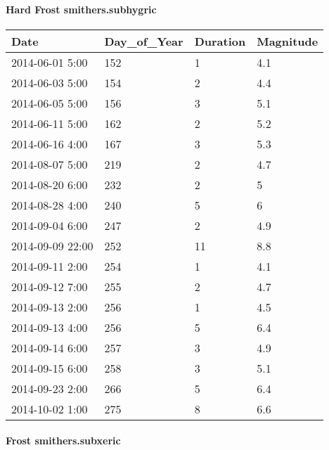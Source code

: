 \documentclass[
]{article}
\begin{document}
\hypertarget{hard-frost-smithers.subhygric}{%
\paragraph{Hard Frost
smithers.subhygric}\label{hard-frost-smithers.subhygric}}

\begin{tabular}{l|l|l|l}
\hline
Date & Day\_of\_Year & Duration & Magnitude\\
\hline
2014-06-01 5:00 & 152 & 1 & 4.1\\
\hline
2014-06-03 5:00 & 154 & 2 & 4.4\\
\hline
2014-06-05 5:00 & 156 & 3 & 5.1\\
\hline
2014-06-11 5:00 & 162 & 2 & 5.2\\
\hline
2014-06-16 4:00 & 167 & 3 & 5.3\\
\hline
2014-08-07 5:00 & 219 & 2 & 4.7\\
\hline
2014-08-20 6:00 & 232 & 2 & 5\\
\hline
2014-08-28 4:00 & 240 & 5 & 6\\
\hline
2014-09-04 6:00 & 247 & 2 & 4.9\\
\hline
2014-09-09 22:00 & 252 & 11 & 8.8\\
\hline
2014-09-11 2:00 & 254 & 1 & 4.1\\
\hline
2014-09-12 7:00 & 255 & 2 & 4.7\\
\hline
2014-09-13 2:00 & 256 & 1 & 4.5\\
\hline
2014-09-13 4:00 & 256 & 5 & 6.4\\
\hline
2014-09-14 6:00 & 257 & 3 & 4.9\\
\hline
2014-09-15 6:00 & 258 & 3 & 5.1\\
\hline
2014-09-23 2:00 & 266 & 5 & 6.4\\
\hline
2014-10-02 1:00 & 275 & 8 & 6.6\\
\hline
\end{tabular}

\hypertarget{frost-smithers.subxeric}{%
\paragraph{Frost smithers.subxeric}\label{frost-smithers.subxeric}}
\end{document}
